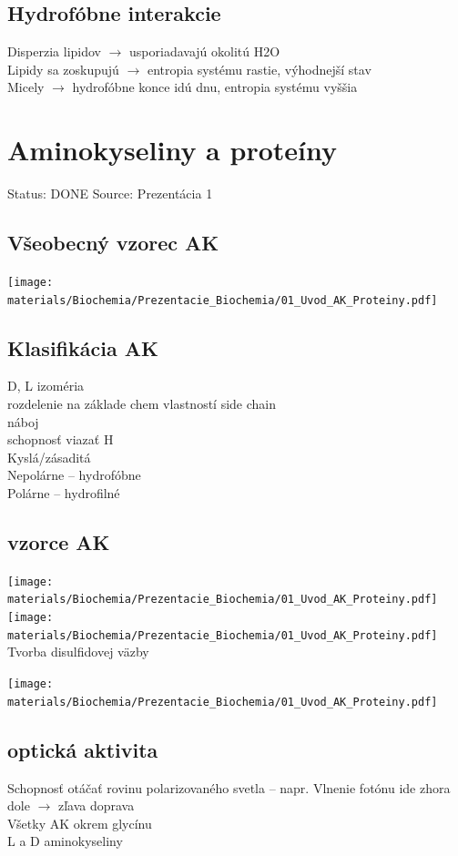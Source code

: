 \subsection*{Hydrofóbne interakcie}
Disperzia lipidov $\rightarrow$ usporiadavajú okolitú H2O\\
Lipidy sa zoskupujú $\rightarrow$ entropia systému rastie, výhodnejší stav\\
Micely $\rightarrow$ hydrofóbne konce idú dnu, entropia systému vyššia\\

\section{Aminokyseliny a proteíny}

Status: DONE
Source: Prezentácia 1
\\
\subsection*{Všeobecný vzorec AK}
\texttt{[image: materials/Biochemia/Prezentacie\_Biochemia/01\_Uvod\_AK\_Proteiny.pdf]}
\subsection*{Klasifikácia AK}
D, L izoméria\\
rozdelenie na základe chem vlastností side chain\\
\tab náboj\\
\tab schopnosť viazať H\\
\tab Kyslá/zásaditá\\
Nepolárne -- hydrofóbne\\
Polárne -- hydrofilné
\subsection*{vzorce AK}
\texttt{[image: materials/Biochemia/Prezentacie\_Biochemia/01\_Uvod\_AK\_Proteiny.pdf]}
\texttt{[image: materials/Biochemia/Prezentacie\_Biochemia/01\_Uvod\_AK\_Proteiny.pdf]}
\\
Tvorba disulfidovej väzby

\texttt{[image: materials/Biochemia/Prezentacie\_Biochemia/01\_Uvod\_AK\_Proteiny.pdf]}
\\
\subsection*{optická aktivita}
Schopnosť otáčať rovinu polarizovaného svetla -- napr. Vlnenie fotónu ide zhora dole $\rightarrow$ zľava doprava\\
Všetky AK okrem glycínu\\
L a D aminokyseliny \\

